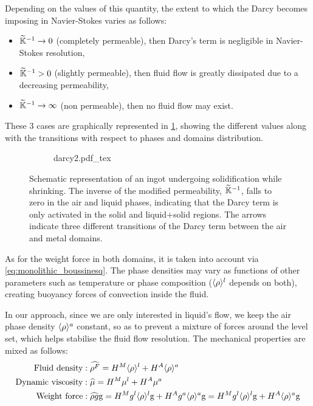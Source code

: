 Depending on the values of this quantity, the extent to which the Darcy becomes imposing in Navier-Stokes varies as follows:
\begin{itemize}
\itemsep0em
\item $\widetilde{\mathbb{K}}^{-1} \rightarrow 0$ (completely permeable), then Darcy's term is negligible in Navier-Stokes resolution,
\item $\widetilde{\mathbb{K}}^{-1} > 0$ (slightly permeable), then fluid flow is greatly dissipated due to a decreasing permeability,
\item $\widetilde{\mathbb{K}}^{-1} \rightarrow \infty$ (non permeable), then no fluid flow may exist.
\end{itemize}
These 3 cases are graphically represented in \cref{fig:darcy_modif}, showing the different values along with the transitions 
with respect to phases and domains distribution. 

\begin{figure}[htbp]
\centering
  \begin{subfigure}{1.0\textwidth}
    \centering
    \def\svgwidth{250pt}
	{darcy2.pdf_tex}
  \end{subfigure}
\caption{Schematic representation of an ingot undergoing solidification while shrinking. 
The inverse of the modified permeability, $\widetilde{\mathbb{K}}^{-1}$, falls to zero in the air and liquid phases,
indicating that the Darcy term is only activated in the solid and liquid+solid regions.
The arrows indicate three different transitions of the Darcy term between the air and metal domains.}
\label{fig:darcy_modif}
\end{figure}

As for the weight force in both domains, it is taken into account via \cref{eq:monolithic_boussinesq}. 
The phase densities may vary as functions of other parameters such
as temperature or phase composition ($\langle \rho \rangle^l$ depends on both), creating buoyancy forces of convection inside the fluid.

In our approach, since we are only interested in liquid's flow, we keep the air phase density $\langle \rho \rangle^a$ constant,
so as to prevent a mixture of forces around the level set, which helps stabilise the fluid flow resolution.
The mechanical properties are mixed as follows:
\begin{align}
%
\label{eq:monolithic_density}
\text{Fluid density}&: \mix{\rho^F} = \heavisideM \rhol + \heavisideA \rhoa \\
%
\label{eq:monolithic_viscosity}
\text{Dynamic viscosity}&: \mix{\mu} = \heavisideM \mul + \heavisideA \mua \\
%
\label{eq:monolithic_boussinesq}
\text{Weight force}&: \mix{\rho g} \gravity 	=  \heavisideM \gl \rhol \gravity + \heavisideA \ga \rhoa \gravity
												=  \heavisideM \gl \rhol \gravity + \heavisideA \rhoa \gravity
%
\end{align}


